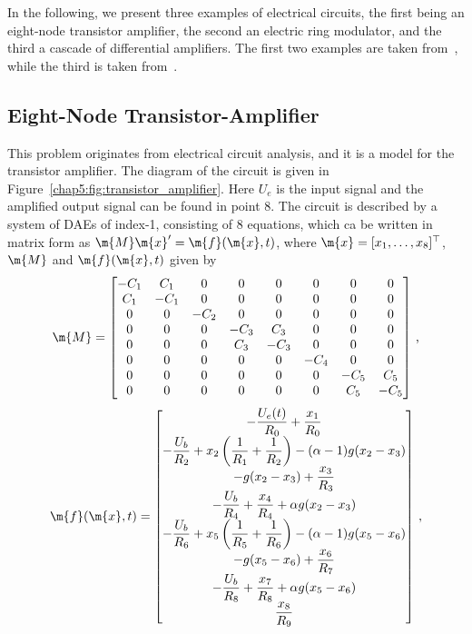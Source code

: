 In the following, we present three examples of electrical circuits, the first being an eight-node transistor amplifier, the second an electric ring modulator, and the third a cascade of differential amplifiers. The first two examples are taken from~\cite{lioen1998test, mazzia2008test}, while the third is taken from~\cite{brenan1995numerical}.

\subsection{Eight-Node Transistor-Amplifier}

This problem originates from electrical circuit analysis, and it is a model for the transistor amplifier. The diagram of the circuit is given in Figure~\ref{chap5:fig:transistor_amplifier}. Here $U_e$ is the input signal and the amplified output signal can be found in point 8. The circuit is described by a system of \acp{DAE} of index-1, consisting of 8 equations, which ca be written in matrix form as $\m{M}\m{x}^\prime = \m{f}(\m{x},t)$, where $\m{x} = [x_1, \dots, x_8]^\top$, $\m{M}$ and $\m{f}(\m{x},t)$ given by
%
\begin{equation}
  \m{M} = \begin{bmatrix}
    -C_1 & C_1 & 0 & 0 & 0 & 0 & 0 & 0 \\
    C_1 & -C_1 & 0 & 0 & 0 & 0 & 0 & 0 \\
    0 & 0 & -C_2 & 0 & 0 & 0 & 0 & 0 \\
    0 & 0 & 0 & -C_3 & C_3 & 0 & 0 & 0 \\
    0 & 0 & 0 & C_3 & -C_3 & 0 & 0 & 0 \\
    0 & 0 & 0 & 0 & 0 & -C_4 & 0 & 0 \\
    0 & 0 & 0 & 0 & 0 & 0 & -C_5 & C_5 \\
    0 & 0 & 0 & 0 & 0 & 0 & C_5 & -C_5
  \end{bmatrix} \, \text{,}
\end{equation}
%
\begin{equation}
  \m{f}(\m{x},t) = \begin{bmatrix}
    -\dfrac{U_e(t)}{R_0} + \dfrac{x_1}{R_0} \\
    -\dfrac{U_b}{R_2} + x_2\left(\dfrac{1}{R_1}+\dfrac{1}{R_2}\right) - (\alpha-1)g(x_2-x_3) \\
    -g(x_2-x_3)+\dfrac{x_3}{R_3} \\
    -\dfrac{U_b}{R_4} + \dfrac{x_4}{R_4} + \alpha g(x_2-x_3) \\
    -\dfrac{U_b}{R_6} + x_5\left(\dfrac{1}{R_5} + \dfrac{1}{R_6}\right)-(\alpha-1) g(x_5-x_6) \\
    -g(x_5-x_6) + \dfrac{x_6}{R_7} \\
    -\dfrac{U_b}{R_8} + \dfrac{x_7}{R_8} + \alpha g(x_5-x_6) \\
    \dfrac{x_8}{R_9}
  \end{bmatrix} \, \text{,}
\end{equation}
